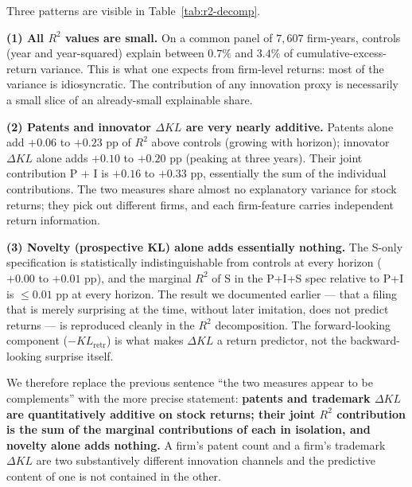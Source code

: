 \documentclass[11pt]{article}
\begin{document}
\begin{table}[h]
\centering
\caption{Cumulative $R^2$ from each combination of predictors on
excess return at horizon $k$, on the common panel of firm-years
with both a patent count and a trademark KL score. All predictors
$z$-scored; year linear and quadratic controls in every cell;
cluster-robust SEs at the firm level (suppressed). The marginal
contribution of each predictor is the difference from the
controls-only baseline.}
\label{tab:r2-decomp}

\end{table}

Three patterns are visible in Table~\ref{tab:r2-decomp}.

\textbf{(1) All $R^2$ values are small.} On a common panel of
$7{,}607$ firm-years, controls (year and year-squared) explain
between $0.7\%$ and $3.4\%$ of cumulative-excess-return variance.
This is what one expects from firm-level returns: most of the
variance is idiosyncratic. The contribution of any innovation
proxy is necessarily a small slice of an already-small explainable
share.

\textbf{(2) Patents and innovator $\Delta KL$ are very nearly
additive.} Patents alone add $+0.06$ to $+0.23$ pp of $R^2$ above
controls (growing with horizon); innovator $\Delta KL$ alone adds
$+0.10$ to $+0.20$ pp (peaking at three years). Their joint
contribution P + I is $+0.16$ to $+0.33$ pp, essentially the sum of
the individual contributions. The two measures share almost no
explanatory variance for stock returns; they pick out different
firms, and each firm-feature carries independent return information.

\textbf{(3) Novelty (prospective KL) alone adds essentially nothing.}
The S-only specification is statistically indistinguishable from
controls at every horizon ($+0.00$ to $+0.01$ pp), and the marginal
$R^2$ of S in the P+I+S spec relative to P+I is $\le 0.01$ pp at
every horizon. The result we documented earlier --- that a filing
that is merely surprising at the time, without later imitation, does
not predict returns --- is reproduced cleanly in the $R^2$
decomposition. The forward-looking component
($-KL_{\text{retr}}$) is what makes $\Delta KL$ a return predictor,
not the backward-looking surprise itself.

We therefore replace the previous sentence ``the two measures appear
to be complements'' with the more precise statement: \textbf{patents
and trademark $\Delta KL$ are quantitatively additive on stock
returns; their joint $R^2$ contribution is the sum of the marginal
contributions of each in isolation, and novelty alone adds nothing.}
A firm's patent count and a firm's trademark $\Delta KL$ are two
substantively different innovation channels and the predictive
content of one is not contained in the other.
\end{document}
